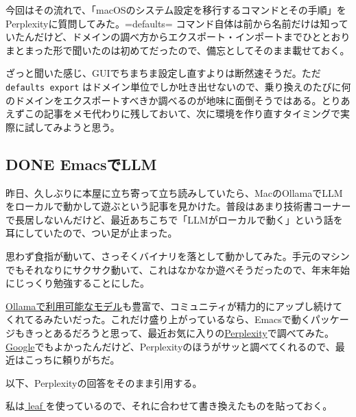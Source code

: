 \documentclass[11pt]{article}
\begin{document}
今回はその流れで、「macOSのシステム設定を移行するコマンドとその手順」をPerplexityに質問してみた。=defaults= コマンド自体は前から名前だけは知っていたんだけど、ドメインの調べ方からエクスポート・インポートまでひととおりまとまった形で聞いたのは初めてだったので、備忘としてそのまま載せておく。

ざっと聞いた感じ、GUIでちまちま設定し直すよりは断然速そうだ。ただ \texttt{defaults export} はドメイン単位でしか吐き出せないので、乗り換えのたびに何のドメインをエクスポートすべきか調べるのが地味に面倒そうではある。とりあえずこの記事をメモ代わりに残しておいて、次に環境を作り直すタイミングで実際に試してみようと思う。
\subsection{{\bfseries\sffamily DONE} EmacsでLLM}
\label{sec:org715d4e7}
昨日、久しぶりに本屋に立ち寄って立ち読みしていたら、MacのOllamaでLLMをローカルで動かして遊ぶという記事を見かけた。普段はあまり技術書コーナーで長居しないんだけど、最近あちこちで「LLMがローカルで動く」という話を耳にしていたので、つい足が止まった。

思わず食指が動いて、さっそくバイナリを落として動かしてみた。手元のマシンでもそれなりにサクサク動いて、これはなかなか遊べそうだったので、年末年始にじっくり勉強することにした。

\href{https://ollama.com/library}{Ollamaで利用可能なモデル}も豊富で、コミュニティが精力的にアップし続けてくれてるみたいだった。これだけ盛り上がっているなら、Emacsで動くパッケージもきっとあるだろうと思って、最近お気に入りの\href{https://www.perplexity.ai}{Perplexity}で調べてみた。\href{https://www.google.com}{Google}でもよかったんだけど、Perplexityのほうがサッと調べてくれるので、最近はこっちに頼りがちだ。

以下、Perplexityの回答をそのまま引用する。

私は\href{https://github.com/conao3/leaf.el}{ leaf }を使っているので、それに合わせて書き換えたものを貼っておく。
\end{document}
